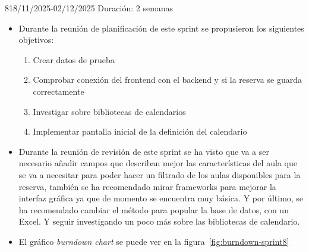 \begin{Sprint}{8}{18/11/2025-02/12/2025}
	Duración: 2 semanas
	\begin{itemize}	
		\item{}
		Durante la reunión de planificación de este sprint se propusieron los siguientes objetivos:
		\begin{enumerate}
			\item Crear datos de prueba
			\item Comprobar conexión del frontend con el backend y si la reserva se guarda correctamente
			\item Investigar sobre bibliotecas de calendarios
			\item Implementar pantalla inicial de la definición del calendario
		\end{enumerate}
		\item{}
		Durante la reunión de revisión de este sprint se ha visto que va a ser necesario añadir campos que describan mejor las características del aula que se va a necesitar para poder hacer un filtrado de los aulas disponibles para la reserva, también se ha recomendado mirar frameworks para mejorar la interfaz gráfica ya que de momento se encuentra muy básica. Y por último, se ha recomendado cambiar el método para popular la base de datos, con un Excel. Y seguir investigando un poco más sobre las bibliotecas de calendario.
		
		\item{} 
		El gráfico \textit{burndown chart} se puede ver en la figura~\ref{fig:burndown-sprint8}
		
	\end{itemize}
\end{Sprint}


